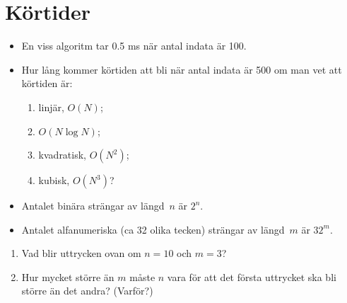 \mode*

\section{Körtider}

\begin{frame}
  \begin{exercise}
    \begin{itemize}
      \item En viss algoritm tar 0.5 ms när antal indata är 100.
      \item Hur lång kommer körtiden att bli när antal indata är 500 om man vet 
        att körtiden är:
        \begin{enumerate}
          \item linjär, \(O(N)\);
          \item \(O(N \log N)\);
          \item kvadratisk, \(O(N^2)\);
          \item kubisk, \(O(N^3)\)?
        \end{enumerate}
    \end{itemize}
  \end{exercise}
\end{frame}

\begin{frame}
  \begin{exercise}
    \begin{itemize}
      \item Antalet binära strängar av längd~\(n\) är \(2^n\).
      \item Antalet alfanumeriska (ca 32 olika tecken) strängar av längd~\(m\) 
        är \(32^m\).
    \end{itemize}
    \begin{enumerate}
      \item Vad blir uttrycken ovan om \(n=10\) och \(m=3\)?
      \item Hur mycket större än \(m\) måste \(n\) vara för att det första 
        uttrycket ska bli större än det andra?
        (Varför?)
    \end{enumerate}
  \end{exercise}
\end{frame}

